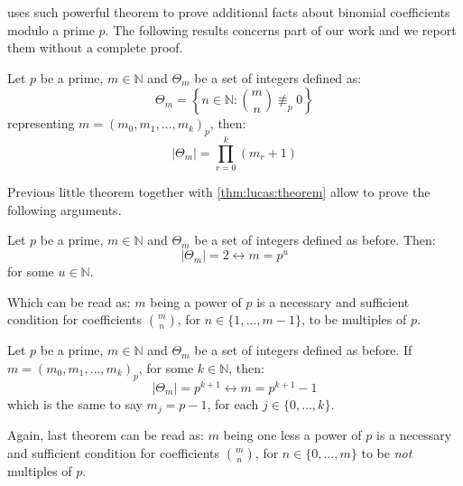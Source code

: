 \citeauthor{fine:1947} uses such powerful theorem to prove additional facts
about binomial coefficients modulo a prime $p$. The following results concerns
part of our work and we report them without a complete proof.

\begin{theorem}
    Let $p$ be a prime, $m\in\mathbb{N}$ and $\Theta_{m}$ be a set of integers defined as: 
    \begin{displaymath}
        \Theta_{m}=\left\lbrace n\in\mathbb{N}: 
            {{m}\choose{n}}\not\equiv_{p}0\right\rbrace
    \end{displaymath}
    representing $m=\left(m_{0},m_{1},\ldots,m_{k}\right)_{p}$, then:
    \begin{displaymath}
        \left|\Theta_{m}\right|=\prod_{r=0}^{k}{(m_{r}+1)}
    \end{displaymath}
    \label{thm:fine:divisibility:binomial:coeffs:on:row}
\end{theorem}

Previous little theorem together with \autoref{thm:lucas:theorem} 
allow \citeauthor{fine:1947} to prove the following arguments.

\begin{theorem}
    Let $p$ be a prime, $m\in\mathbb{N}$ and $\Theta_{m}$ 
    be a set of integers defined as before. Then:   
    \begin{displaymath}
        \left|\Theta_{m}\right|=2\leftrightarrow m=p^{u}
    \end{displaymath}
    for some $u\in\mathbb{N}$.
\end{theorem}

Which can be read as: \flqq $m$ being a power of $p$ is a necessary and 
sufficient condition for coefficients ${{m}\choose{n}}$, for $n\in\lbrace1,\ldots,m-1\rbrace$, 
    to be multiples of $p$\frqq.

\begin{theorem}
    Let $p$ be a prime, $m\in\mathbb{N}$ and $\Theta_{m}$ 
    be a set of integers defined as before.
    If $m=\left(m_{0},m_{1},\ldots,m_{k}\right)_{p}$, for some $k\in\mathbb{N}$, then:
    \begin{displaymath}
        \left|\Theta_{m}\right|=p^{k+1}\leftrightarrow m=p^{k+1}-1
    \end{displaymath}
    which is the same to say $m_{j}=p-1$, for each $j\in\lbrace 0,\ldots,k\rbrace$.
\end{theorem}

Again, last theorem can be read as: \flqq $m$ being one less a power of $p$ is a 
necessary and sufficient condition for coefficients ${{m}\choose{n}}$, for $n\in\lbrace0,\ldots,m\rbrace$ to
    be \emph{not} multiples of $p$\frqq.


